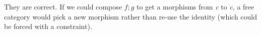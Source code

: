 They are correct. If we could compose $f;g$ to get a morphisms from \emph{c} to \emph{c}, a free category would pick a new morphism rather than re-use the identity (which could be forced with a constraint).
